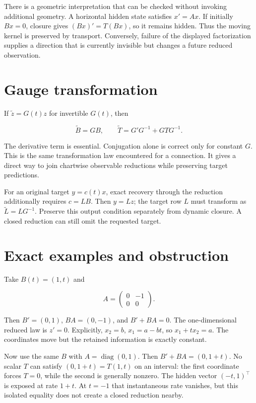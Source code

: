 \documentclass[
  11pt,
  a4paper,
]{report}
\begin{document}
There is a geometric interpretation that can be checked without invoking
additional geometry. A horizontal hidden state satisfies \(x'=Ax\). If
initially \(Bx=0\), closure gives \((Bx)'=T(Bx)\), so it remains hidden.
Thus the moving kernel is preserved by transport. Conversely, failure of
the displayed factorization supplies a direction that is currently
invisible but changes a future reduced observation.

\hypertarget{gauge-transformation}{%
\section{Gauge transformation}\label{gauge-transformation}}

If \(\widetilde z=G(t)z\) for invertible \(G(t)\), then

\[
\widetilde B=GB,\qquad
\widetilde T=G'G^{-1}+GTG^{-1}.
\]

The derivative term is essential. Conjugation alone is correct only for
constant \(G\). This is the same transformation law encountered for a
connection. It gives a direct way to join chartwise observable
reductions while preserving target predictions.

For an original target \(y=c(t)x\), exact recovery through the reduction
additionally requires \(c=LB\). Then \(y=Lz\); the target row \(L\) must
transform as \(\widetilde L=LG^{-1}\). Preserve this output condition
separately from dynamic closure. A closed reduction can still omit the
requested target.

\hypertarget{exact-examples-and-obstruction}{%
\section{Exact examples and
obstruction}\label{exact-examples-and-obstruction}}

Take \(B(t)=(1,t)\) and

\[
A=\begin{pmatrix}0&-1\\0&0\end{pmatrix}.
\]

Then \(B'=(0,1)\), \(BA=(0,-1)\), and \(B'+BA=0\). The one-dimensional
reduced law is \(z'=0\). Explicitly, \(x_2=b\), \(x_1=a-bt\), so
\(x_1+tx_2=a\). The coordinates move but the retained information is
exactly constant.

Now use the same \(B\) with \(A=\operatorname{diag}(0,1)\). Then
\(B'+BA=(0,1+t)\). No scalar \(T\) can satisfy \((0,1+t)=T(1,t)\) on an
interval: the first coordinate forces \(T=0\), while the second is
generally nonzero. The hidden vector \((-t,1)^\top\) is exposed at rate
\(1+t\). At \(t=-1\) that instantaneous rate vanishes, but this isolated
equality does not create a closed reduction nearby.
\end{document}
